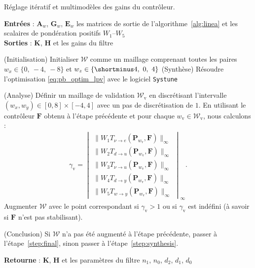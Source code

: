 \begin{algorithm}
  \caption{Réglage itératif et multimodèles des gains du contrôleur.}
  \label{alg:iterativeOptimisation}
  \hspace*{.1cm} \textbf{Entrées} : $\boldsymbol{A}_{w}$, $\boldsymbol{G}_{w}$, $\boldsymbol{E}_{w}$  les matrices de sortie de l'algorithme~\ref{alg:linea} et les scalaires de pondération positifs $W_1$--$W_5$\\
  \hspace*{.1cm} \textbf{Sorties} : $\boldsymbol{K}$, $\boldsymbol{H}$ et les gains du filtre
  \begin{algorithmic}[1]
   
    \State (Initialisation) Initialiser ${\mathcal W}$ comme un maillage comprenant toutes les paires $ w_{x} \in \{0,~-4,~-8\}$ et $ w_{z} \in \{\shortminus 4,~0,~4\}$
    \State \label{step:synthesis} (Synthèse) Résoudre l'optimisation \eqref{eq:pb_optim_lpv} avec le logiciel {\tt Systune}

    \State \label{step:analysis} (Analyse) Définir un maillage de validation ${\mathcal W}_{\text{v}}$ en discrétisant l'intervalle $(w_x,w_y) \in [0,8]\times[-4,4]$ avec un pas de discrétisation de $1$. En utilisant le contrôleur $\boldsymbol{F}$ obtenu à l'étape précédente et pour chaque $w_{\text{v}}\in {\mathcal W}_{\text{v}}$, nous calculons :
    \begin{align}
    \label{eq:validation_step}
    \gamma_{\text{v}} = \begin{vmatrix}
    \| W_{1} T_{\nu \rightarrow e}(\boldsymbol{P}_{w_{\text{v}}},\boldsymbol{F})\|_{\infty} \\
    \|W_{2} T_{d \rightarrow u}(\boldsymbol{P}_{w_{\text{v}}},\boldsymbol{F})\|_{\infty}\\
    \|W_{3} T_{\nu \rightarrow u}(\boldsymbol{P}_{w_{\text{v}}},\boldsymbol{F})\|_{\infty}\\
    \|W_{4} T_{d \rightarrow y}(\boldsymbol{P}_{w_{\text{v}}},\boldsymbol{F})\|_{\infty}\\
    \|W_{5} T_{w \rightarrow y}(\boldsymbol{P}_{w_{\text{v}}},\boldsymbol{F})\|_{\infty}
    \end{vmatrix}_{\infty}.
    \end{align}
    Augmenter  ${\mathcal W}$ avec le point correspondant si $\gamma_{\text{v}} > 1$ ou si $\gamma_{\text{v}}$ est indéfini (à savoir si $\boldsymbol{F}$ n'est pas stabilisant).


    \State (Conclusion) Si ${\mathcal W}$ n'a pas été augmenté à l'étape précédente, passer à l'étape~\ref{step:final}, sinon passer à l'étape~\ref{step:synthesis}.
    
    \State \label{step:final} 
    \textbf{Retourne} : $\boldsymbol{K}$, $\boldsymbol{H}$ et les paramètres du filtre $n_1$, $n_0$,  $d_2$,  $d_1$,  $d_0$

  \end{algorithmic}
\end{algorithm}

